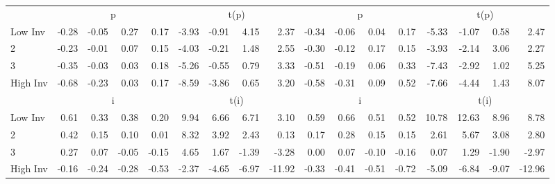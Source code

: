 \begin{table}[!ht]
\begin{tabular}{lrrrrrrrrrrrrrrrr}
  
    
      & \multicolumn{4}{c}{p} & \multicolumn{4}{c}{t(p)}
    
      & \multicolumn{4}{c}{p} & \multicolumn{4}{c}{t(p)}
    
    \\
      \cmidrule(r){2-5} \cmidrule(r){6-9} \cmidrule(r){10-13} \cmidrule(r){14-17}

    Low Inv   & -0.28  & -0.05  & 0.27  & 0.17  & -3.93  & -0.91  & 4.15  & 2.37  & -0.34  & -0.06  & 0.04  & 0.17  & -5.33  & -1.07  & 0.58  & 2.47  \\
           2  & -0.23  & -0.01  & 0.07  & 0.15  & -4.03  & -0.21  & 1.48  & 2.55  & -0.30  & -0.12  & 0.17  & 0.15  & -3.93  & -2.14  & 3.06  & 2.27  \\
           3  & -0.35  & -0.03  & 0.03  & 0.18  & -5.26  & -0.55  & 0.79  & 3.33  & -0.51  & -0.19  & 0.06  & 0.33  & -7.43  & -2.92  & 1.02  & 5.25  \\
    High Inv  & -0.68  & -0.23  & 0.03  & 0.17  & -8.59  & -3.86  & 0.65  & 3.20  & -0.58  & -0.31  & 0.09  & 0.52  & -7.66  & -4.44  & 1.43  & 8.07  \\

  
    
      & \multicolumn{4}{c}{i} & \multicolumn{4}{c}{t(i)}
    
      & \multicolumn{4}{c}{i} & \multicolumn{4}{c}{t(i)}
    
    \\
      \cmidrule(r){2-5} \cmidrule(r){6-9} \cmidrule(r){10-13} \cmidrule(r){14-17}

    Low Inv   & 0.61  & 0.33  & 0.38  & 0.20  & 9.94  & 6.66  & 6.71  & 3.10  & 0.59  & 0.66  & 0.51  & 0.52  & 10.78  & 12.63  & 8.96  & 8.78  \\
           2  & 0.42  & 0.15  & 0.10  & 0.01  & 8.32  & 3.92  & 2.43  & 0.13  & 0.17  & 0.28  & 0.15  & 0.15  & 2.61  & 5.67  & 3.08  & 2.80  \\
           3  & 0.27  & 0.07  & -0.05  & -0.15  & 4.65  & 1.67  & -1.39  & -3.28  & 0.00  & 0.07  & -0.10  & -0.16  & 0.07  & 1.29  & -1.90  & -2.97  \\
    High Inv  & -0.16  & -0.24  & -0.28  & -0.53  & -2.37  & -4.65  & -6.97  & -11.92  & -0.33  & -0.41  & -0.51  & -0.72  & -5.09  & -6.84  & -9.07  & -12.96  \\

  

  \bottomrule
\end{tabular}
\label{tbl:32_Size_OP_Inv_FF2016}
\end{table}